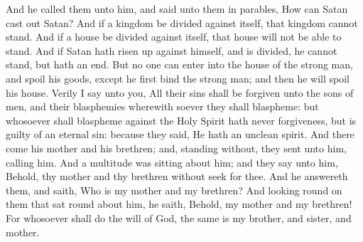 And he called them unto him, and said unto them in parables, How can Satan cast out Satan? And if a kingdom be divided against itself, that kingdom cannot stand. And if a house be divided against itself, that house will not be able to stand. And if Satan hath risen up against himself, and is divided, he cannot stand, but hath an end. But no one can enter into the house of the strong man, and spoil his goods, except he first bind the strong man; and then he will spoil his house. Verily I say unto you, All their sins shall be forgiven unto the sons of men, and their blasphemies wherewith soever they shall blaspheme: but whosoever shall blaspheme against the Holy Spirit hath never forgiveness, but is guilty of an eternal sin: because they said, He hath an unclean spirit.  And there come his mother and his brethren; and, standing without, they sent unto him, calling him. And a multitude was sitting about him; and they say unto him, Behold, thy mother and thy brethren without seek for thee. And he answereth them, and saith, Who is my mother and my brethren? And looking round on them that sat round about him, he saith, Behold, my mother and my brethren! For whosoever shall do the will of God, the same is my brother, and sister, and mother. 

